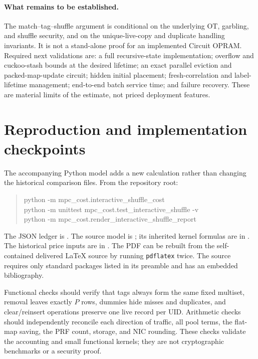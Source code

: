 \documentclass[11pt]{article}
\begin{document}
\paragraph{What remains to be established.}
The match--tag--shuffle argument is conditional on the underlying OT,
garbling, and shuffle security, and on the unique-live-copy and duplicate
handling invariants. It is not a stand-alone proof for an implemented
Circuit OPRAM. Required next validations are: a full recursive-state
implementation; overflow and cuckoo-stash bounds at the desired lifetime;
an exact parallel eviction and packed-map-update circuit; hidden initial
placement; fresh-correlation and label-lifetime management; end-to-end
batch service time; and failure recovery. These are material limits of the
estimate, not priced deployment features.

\section{Reproduction and implementation checkpoints}
The accompanying Python model adds a new calculation rather than changing
the historical comparison files. From the repository root:
\begin{quote}\small\ttfamily
python -m mpc\_cost.interactive\_shuffle\_cost\\
python -m unittest mpc\_cost.test\_interactive\_shuffle -v\\
python -m mpc\_cost.render\_interactive\_shuffle\_report
\end{quote}
The JSON ledger is .
The source model is ; its inherited
kernel formulas are in . The historical
price inputs are in .
The PDF can be rebuilt from the self-contained delivered \LaTeX{} source by
running \texttt{pdflatex} twice. The source requires only standard packages
listed in its preamble and has an embedded bibliography.

Functional checks should verify that tags always form the same fixed
multiset, removal leaves exactly $P$ rows, dummies hide misses and duplicates,
and clear/reinsert operations preserve one live record per UID. Arithmetic
checks should independently reconcile each direction of traffic, all pool
terms, the flat-map saving, the PRF count, storage, and NIC rounding. These
checks validate the accounting and small functional kernels; they are not
cryptographic benchmarks or a security proof.
\end{document}
